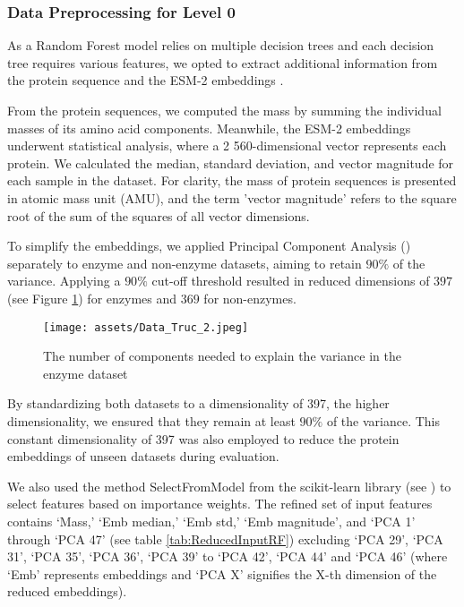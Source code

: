 \documentclass{bioinfo}
\begin{document}
\begin{methods}
\subsubsection{Data Preprocessing for Level 0}
As a Random Forest model relies on multiple decision trees and each
decision tree requires various features, we opted to extract additional
information from the protein sequence and the ESM-2 embeddings \cite{ESM2}.

From the protein sequences, we computed the mass by summing the individual masses of its amino acid components. 
Meanwhile, the ESM-2 embeddings underwent statistical analysis, where a 2 560-dimensional vector represents each protein.
We calculated the median, standard deviation, and vector magnitude for each sample in the dataset.
For clarity, the mass of protein sequences is presented in atomic mass unit (AMU),
and the term 'vector magnitude' refers to the square root of the sum of the squares of all vector dimensions.

To simplify the embeddings, we applied Principal Component Analysis (\cite{scikit-learn})
separately to enzyme and non-enzyme datasets,
aiming to retain $90\%$ of the variance. Applying a $90\%$ cut-off threshold resulted in reduced dimensions of $397$ (see Figure \ref{fig:PCA_enzymes}) for enzymes and $369$ for non-enzymes. 

\begin{figure}[!tbp]
\texttt{[image: assets/Data\_Truc\_2.jpeg]}
\caption{The number of components needed to explain the variance in the enzyme dataset}\label{fig:PCA_enzymes}
\end{figure}

By standardizing both datasets to a dimensionality of 397, the higher dimensionality, we ensured that they remain at least $90\%$ of the variance.
This constant dimensionality of 397 was also employed to reduce the protein embeddings of unseen datasets during evaluation.

We also used the method SelectFromModel from the scikit-learn library (see \cite{scikit-learn})
to select features based on importance weights. 
The refined set of input features contains 
‘Mass,’ ‘Emb median,’ ‘Emb std,’ ‘Emb magnitude’, and ‘PCA 1’ through ‘PCA 47’ (see table \ref{tab:ReducedInputRF}) excluding ‘PCA 29’, ‘PCA 31’, ‘PCA 35’,
‘PCA 36’, ‘PCA 39’ to ‘PCA 42’, ‘PCA 44’ and ‘PCA 46’ (where ‘Emb’ represents embeddings and ‘PCA X’ signifies the X-th dimension of the reduced embeddings).


\end{methods}
\end{document}
